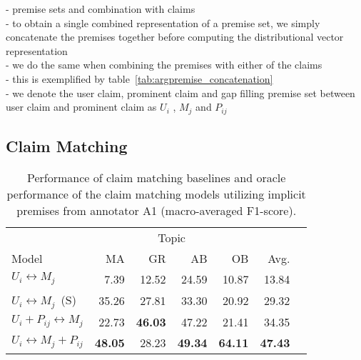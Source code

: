 \noindent - premise sets and combination with claims \\
- to obtain a single combined representation of a premise set, we simply
concatenate the premises together before computing the distributional vector
representation \\
- we do the same when combining the premises with either of the claims \\
- this is exemplified by table~\ref{tab:argpremise_concatenation} \\
- we denote the user claim, prominent claim and gap filling premise set between 
user claim and prominent claim as
$U_i$ , $M_j$ and $P_{ij}$ \\

\subsection{Claim Matching}

\begin{table}
\begin{center}
{\small
\setlength{\tabcolsep}{5.9pt}
\begin{tabular}{lrrrrrr}
\toprule
&\multicolumn{4}{c}{Topic}\\
\cmidrule(lr){2-5}
Model & MA & GR  & AB & OB & Avg. \\
\midrule
$U_i \leftrightarrow M_j$      & 7.39          & 12.52        & 24.59        & 10.87        & 13.84 \\
$U_i \leftrightarrow M_j$\ (S)  & 35.26         & 27.81        & 33.30        & 20.92        & 29.32 \\
$U_i + P_{ij} \leftrightarrow M_j$   & 22.73         & {\bf 46.03}  & 47.22        & 21.41        & 34.35 \\
$U_i \leftrightarrow M_j + P_{ij} $ & {\bf 48.05}   & 28.23        & {\bf 49.34}  & {\bf 64.11}  & {\bf 47.43} \\
\bottomrule
\end{tabular}}
\caption{Performance of claim matching baselines and oracle performance of the
claim matching models utilizing implicit premises from annotator A1
(macro-averaged F1-score).}
\label{tab:argpremise_matching}
\end{center}
\end{table}


